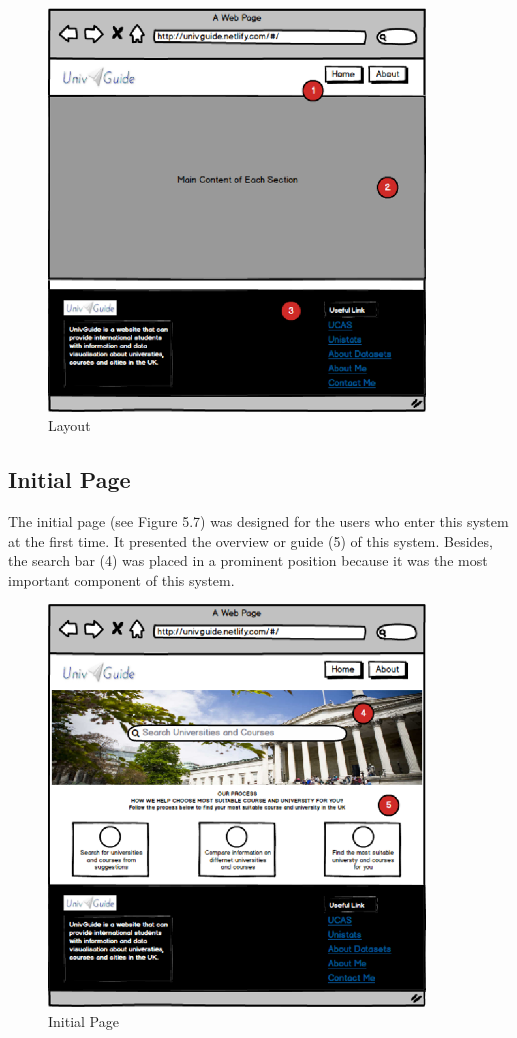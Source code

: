 \begin{figure}[H]
  \centering
  \includegraphics[width=10cm]{./img/Picture12}
  \caption{Layout}
  \label{Figure:figex}
\end{figure}



\subsection{Initial Page}
The initial page (see Figure 5.7) was designed for the users who enter this system at the first time.  It presented the overview or guide (5) of this system. Besides, the search bar (4) was placed in a prominent position because it was the most important component of this system.


\begin{figure}[H]
  \centering
  \includegraphics[width=10cm]{./img/Picture13}
  \caption{Initial Page}
  \label{Figure:figex}
\end{figure}


